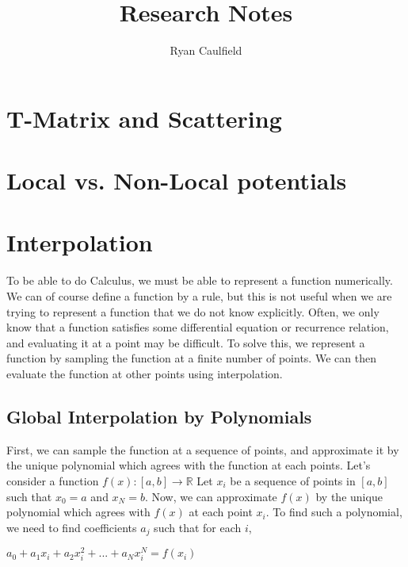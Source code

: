 \documentclass[12pt,letterpaper]{article}
\title{Research Notes}
\author{Ryan Caulfield}
\date{}
\newcommand{\reals}{\mathbb{R}}
\begin{document}
\maketitle
\newpage

\maketitle
\tableofcontents

\newpage
\section{T-Matrix and Scattering}
\section{Local vs. Non-Local potentials}

\newpage
\appendix

\section{Interpolation}
To be able to do Calculus, we must be able to represent a function numerically. We can of course define a function by a rule, but this is not useful when we are trying to represent a function that we do not know explicitly. Often, we only know that a function satisfies some differential equation or recurrence relation, and evaluating it at a point may be difficult. To solve this, we represent a function by sampling the function at a finite number of points. We can then evaluate the function at other points using interpolation.

\subsection{Global Interpolation by Polynomials}
First, we can sample the function at a sequence of points, and approximate it by the unique polynomial which agrees with the function at each points. Let's consider a function $f(x) : [a,b] \rightarrow \reals$ Let $x_i$ be a sequence of points in $[a,b]$ such that $x_0 = a$ and $x_N = b$. Now, we can approximate $f(x)$ by the unique polynomial which agrees with $f(x)$ at each point $x_i$. To find such a polynomial, we need to find coefficients $a_j$ such that for each $i$,
\begin{center}
$a_0 + a_1 x_i + a_2 x_i^2 + ... + a_N x_i^N = f(x_i)$
\end{center}
\end{document}
